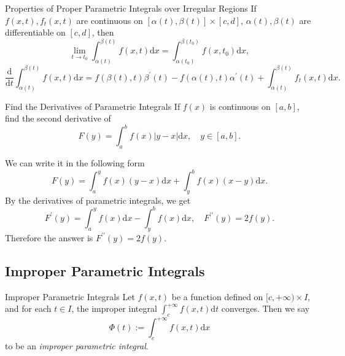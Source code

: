 \begin{proposition}{Properties of Proper Parametric Integrals over Irregular Regions}{}
  If $f(x, t), f_t(x, t)$ are continuous on $[\alpha(t), \beta(t)] \times [c, d]$,
  $\alpha(t), \beta(t)$ are differentiable on $[c, d]$, then
  \begin{equation}
    \lim \limits _{t \rightarrow t_0} \int_{\alpha(t)}^{\beta(t)}f(x,t)\mathrm{d} x
    = \int_{\alpha(t_0)}^{\beta(t_0)} f(x, t_0)\mathrm{d} x,
  \end{equation}
  \begin{equation}
    \frac{\mathrm{d}}{\mathrm{d}t} \int_{\alpha(t)}^{\beta(t)} f(x, t)\mathrm{d} x
    = f(\beta(t), t)\beta^{\prime}(t) - f(\alpha(t), t) \alpha^{\prime}(t)
    + \int_{\alpha(t)}^{\beta(t)}f_t(x, t)\mathrm{d} x.
  \end{equation}
\end{proposition}

\begin{example}{Find the Derivatives of Parametric Integrals}{}
  If $f(x)$ is continuous on $[a, b]$, find the second derivative of
  \begin{equation}
    F(y) = \int_a^b f(x) |y - x| \mathrm{d} x, \quad y \in [a, b].
  \end{equation}
\end{example}

\begin{solution}
  We can write it in the following form
  \begin{equation}
    F(y) = \int_a^y f(x)(y-x)\mathrm{d} x + \int_y^b f(x)(x-y)\mathrm{d} x.
  \end{equation}
  By the derivatives of parametric integrals, we get
  \begin{equation}
    F^{\prime}(y) = \int_a^y f(x)\mathrm{d} x- \int_y^bf(x)\mathrm{d}x, \quad
    F^{\prime\prime}(y) = 2f(y).
  \end{equation}
  Therefore the answer is $F^{\prime\prime}(y) = 2f(y)$.
\end{solution}

\subsection{Improper Parametric Integrals}

\begin{definition}{Improper Parametric Integrals}{}
  Let $f(x, t)$ be a function defined on $[c, +\infty) \times I$,
  and for each $t \in I$, the improper integral
  $\int_c^{+\infty}f(x,t)\mathrm{d}t$ converges.
  Then we say
  \begin{equation}
    \Phi(t) := \int_c^{+\infty} f(x, t)\mathrm{d} x
  \end{equation}
  to be an \emph{improper parametric integral}.
\end{definition}

